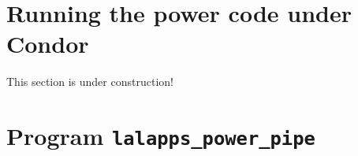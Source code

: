 \clearpage
\section{Running the power code under Condor}
\label{subsection:running_power}

This section is under construction!


\clearpage
\section{Program \texttt{lalapps\_power\_pipe}}
\label{program:lalapps-power-pipe}

